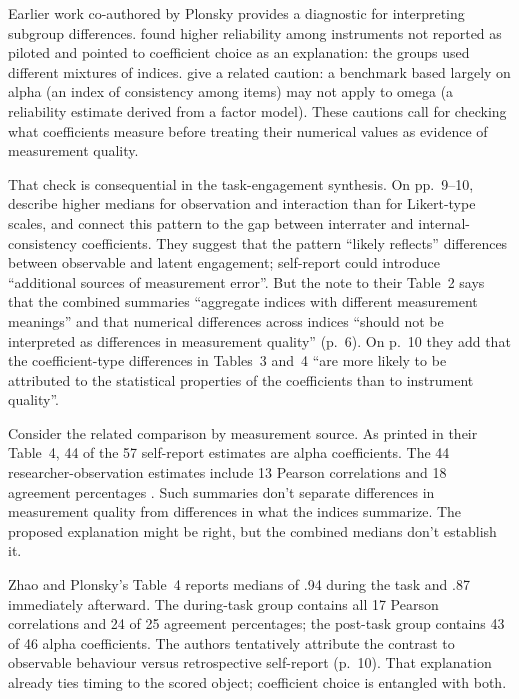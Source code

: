 \documentclass[12pt,twoside]{article}
\begin{document}
Earlier work co-authored by Plonsky provides a diagnostic for interpreting subgroup differences. \textcite[p.\ 549]{PlonskyDerrick2016} found higher reliability among instruments not reported as piloted and pointed to coefficient choice as an explanation: the groups used different mixtures of indices. \textcite[p.\ 252]{ZhaoPlonsky2024} give a related caution: a benchmark based largely on alpha (an index of consistency among items) may not apply to omega (a reliability estimate derived from a factor model). These cautions call for checking what coefficients measure before treating their numerical values as evidence of measurement quality.

That check is consequential in the task-engagement synthesis. On pp.\ 9--10, \textcite{ZhaoPlonsky2026} describe higher medians for observation and interaction than for Likert-type scales, and connect this pattern to the gap between interrater and internal-consistency coefficients. They suggest that the pattern \enquote{likely reflects} differences between observable and latent engagement; self-report could introduce \enquote{additional sources of measurement error}. But the note to their Table~2 says that the combined summaries \enquote{aggregate indices with different measurement meanings} and that numerical differences across indices \enquote{should not be interpreted as differences in measurement quality} (p.\ 6). On p.~10 they add that the coefficient-type differences in Tables~3 and~4 \enquote{are more likely to be attributed to the statistical properties of the coefficients than to instrument quality}.

Consider the related comparison by measurement source. As printed in their Table~4, 44 of the 57 self-report estimates are alpha coefficients. The 44 researcher-observation estimates include 13 Pearson correlations and 18 agreement percentages \citep[p.\ 8]{ZhaoPlonsky2026}. Such summaries don't separate differences in measurement quality from differences in what the indices summarize. The proposed explanation might be right, but the combined medians don't establish it.

Zhao and Plonsky's Table~4 reports medians of .94 during the task and .87 immediately afterward. The during-task group contains all 17 Pearson correlations and 24 of 25 agreement percentages; the post-task group contains 43 of 46 alpha coefficients. The authors tentatively attribute the contrast to observable behaviour versus retrospective self-report (p.\ 10). That explanation already ties timing to the scored object; coefficient choice is entangled with both.
\end{document}
